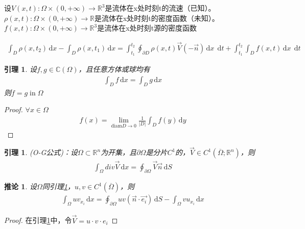 \documentclass[11pt, a4paper]{article}
\theoremstyle{theorem}
\newtheorem{lemma}[thm]{引理}
\newtheorem{cor}[thm]{推论}
\newcommand{\intd}[1]{\,\mathrm{d}{#1}}
\begin{document}
设$V(x,t): \Omega \times (0, + \infty) \rightarrow \mathbb{R}^3$是流体在x处时刻t的流速（已知）。$\rho(x,t): \Omega \times (0, + \infty) \rightarrow \mathbb{R}$是流体在x处时刻t的密度函数（未知）。$f(x,t): \Omega \times (0, + \infty) \rightarrow \mathbb{R}^3$是流体在x处时刻t源的密度函数

\begin{align}
\int_D \rho(x,t_2) \intd x - \int_D \rho(x,t_1) \intd x = \int_{t_1}^{t_2} \oint_{\partial D} \rho(x,t) \vec{V}(- \vec{n}) \intd x \; \intd t + \int_{t_1}^{t_2} \int_D f(x,t) \intd x \; \intd t
\end{align}

\begin{lemma}
\label{lemma2-1}
设$f, g \in \mathbb{C}(\Omega)$，且任意方体或球均有
\begin{align*}
\int_D f \intd x = \int_D g \intd x
\end{align*}
则$f = g \; \text{in} \; \Omega$
\end{lemma}

\begin{proof}
$\forall x \in \Omega$
\begin{align}
f(x) = \lim_{\text{diam} D \rightarrow 0} \frac{1}{|D|} \int_D f(y) \intd y
\end{align}

\end{proof}

\begin{lemma}
\label{lemma2-2}
(O-G公式)：设$\Omega \subset \mathbb{R}^n$为开集，且$\partial \Omega$是分片$C^1$的，$\vec{V} \in C^1(\overline{\Omega}; \mathbb{R}^n)$，则
\begin{align}
\int_\Omega div \vec{V} \intd x = \oint_{\partial \Omega} \vec{V} \vec{n} \intd S
\end{align}
\end{lemma}

\begin{cor}
设$\Omega$同引理\ref{lemma2-2}，$u,v \in C^1(\overline{\Omega})$，则
\begin{align}
\int_\Omega u v_{x_i} \intd x = \oint_{\partial \Omega} u v(\vec{n}\cdot \vec{e_i}) \intd S - \int_\Omega v u_{x_i} \intd x
\end{align}
\end{cor}
\begin{proof}
在引理\ref{lemma2-2}中，令$\vec{V} = u \cdot v \cdot e_i$

\end{proof}
\end{document}
